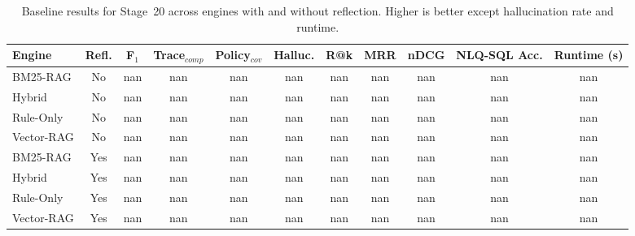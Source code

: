 \begin{table}[!t]
\centering
\caption{Baseline results for Stage~20 across engines with and without reflection. Higher is better except hallucination rate and runtime.}
\label{tab:stage20-baselines}
\begin{tabular}{lcccccccccc}
\toprule
Engine & Refl. & F$_1$ & Trace$_{comp}$ & Policy$_{cov}$ & Halluc. & R@k & MRR & nDCG & NLQ-SQL Acc. & Runtime (s)\\
\midrule
BM25-RAG & No & nan & nan & nan & nan & nan & nan & nan & nan & nan\\
Hybrid & No & nan & nan & nan & nan & nan & nan & nan & nan & nan\\
Rule-Only & No & nan & nan & nan & nan & nan & nan & nan & nan & nan\\
Vector-RAG & No & nan & nan & nan & nan & nan & nan & nan & nan & nan\\
BM25-RAG & Yes & nan & nan & nan & nan & nan & nan & nan & nan & nan\\
Hybrid & Yes & nan & nan & nan & nan & nan & nan & nan & nan & nan\\
Rule-Only & Yes & nan & nan & nan & nan & nan & nan & nan & nan & nan\\
Vector-RAG & Yes & nan & nan & nan & nan & nan & nan & nan & nan & nan\\
\bottomrule
\end{tabular}
\end{table}
